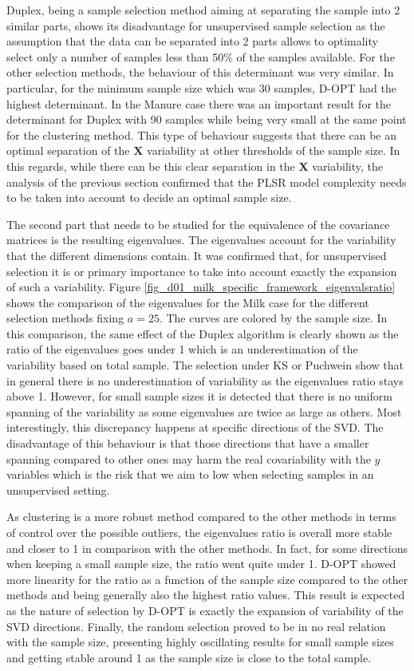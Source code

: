 \documentclass{article}
\begin{document}
Duplex, being a sample selection method aiming at separating the sample into 2 similar parts, shows its disadvantage for unsupervised sample selection as the assumption that the data can be separated into 2 parts allows to optimality select only a number of samples less than 50\% of the samples available. For the other selection methods, the behaviour of this determinant was very similar. In particular, for the minimum sample size which was 30 samples, D-OPT had the highest determinant. In the Manure case there was an important result for the determinant for Duplex with 90 samples while being very small at the same point for the clustering method. This type of behaviour suggests that there can be an optimal separation of the $\mathbf{X}$ variability at other thresholds of the sample size. In this regards, while there can be this clear separation in the $\mathbf{X}$ variability, the analysis of the previous section confirmed that the PLSR model complexity needs to be taken into account to decide an optimal sample size. 

The second part that needs to be studied for the equivalence of the covariance matrices is the resulting eigenvalues. The eigenvalues account for the variability that the different dimensions contain. It was confirmed that, for unsupervised selection it is or primary importance to take into account exactly the expansion of such a variability. Figure \ref{fig_d01_milk_specific_framework_eigenvalsratio} shows the comparison of the eigenvalues for the Milk case for the different selection methods fixing $a=25$. The curves are colored by the sample size. In this comparison, the same effect of the Duplex algorithm is clearly shown as the ratio of the eigenvalues goes under 1 which is an underestimation of the variability based on total sample.  The selection under KS or Puchwein show that in general there is no underestimation of variability as the eigenvalues ratio stays above 1. However, for small sample sizes it is detected that there is no uniform spanning of the variability as some eigenvalues are twice as large as others. Most interestingly, this discrepancy happens at specific directions of the SVD. The disadvantage of this behaviour is that those directions that have a smaller spanning compared to other ones may harm the real covariability with the $y$ variables which is the risk that we aim to low when selecting samples in an unsupervised setting. 

As clustering is a more robust method compared to the other methods in terms of control over the possible outliers, the eigenvalues ratio is overall more stable and closer to 1 in comparison with the other methods. In fact, for some directions when keeping a small sample size, the ratio went quite under 1. D-OPT showed more linearity for the ratio as a function of the sample size compared to the other methods and being generally also the highest ratio values. This result is expected as the nature of selection by D-OPT is exactly the expansion of variability of the SVD directions.  Finally, the random selection proved to be in no real relation with the sample size, presenting highly oscillating results for small sample sizes and getting stable around 1 as the sample size is close to the total sample. 
\end{document}
